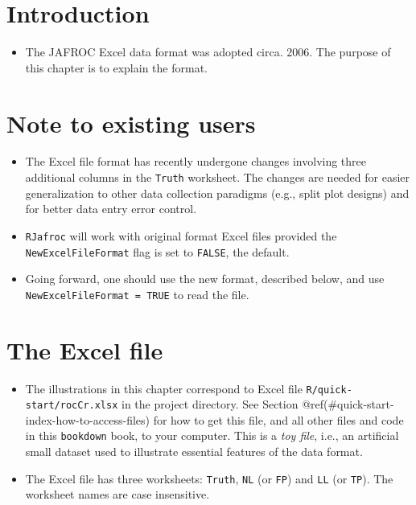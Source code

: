 \documentclass[
]{book}
\providecommand{\tightlist}{%
  \setlength{\itemsep}{0pt}\setlength{\parskip}{0pt}}
\begin{document}
\hypertarget{quick-start-data-format-intro}{%
\section{Introduction}\label{quick-start-data-format-intro}}

\begin{itemize}
\tightlist
\item
  The JAFROC Excel data format was adopted circa. 2006. The purpose of this chapter is to explain the format.
\end{itemize}

\hypertarget{quick-start-data-format-note-to-existing-users}{%
\section{Note to existing users}\label{quick-start-data-format-note-to-existing-users}}

\begin{itemize}
\tightlist
\item
  The Excel file format has recently undergone changes involving three additional columns in the \texttt{Truth} worksheet. The changes are needed for easier generalization to other data collection paradigms (e.g., split plot designs) and for better data entry error control.
\item
  \texttt{RJafroc} will work with original format Excel files provided the \texttt{NewExcelFileFormat} flag is set to \texttt{FALSE}, the default.
\item
  Going forward, one should use the new format, described below, and use \texttt{NewExcelFileFormat\ =\ TRUE} to read the file.
\end{itemize}

\hypertarget{quick-start-data-format-contents}{%
\section{The Excel file}\label{quick-start-data-format-contents}}

\begin{itemize}
\tightlist
\item
  The illustrations in this chapter correspond to Excel file \texttt{R/quick-start/rocCr.xlsx} in the project directory. See Section @ref(\#quick-start-index-how-to-access-files) for how to get this file, and all other files and code in this \texttt{bookdown} book, to your computer. This is a \emph{toy file}, i.e., an artificial small dataset used to illustrate essential features of the data format.
\item
  The Excel file has three worksheets: \texttt{Truth}, \texttt{NL} (or \texttt{FP}) and \texttt{LL} (or \texttt{TP}). The worksheet names are case insensitive.
\end{itemize}
\end{document}

